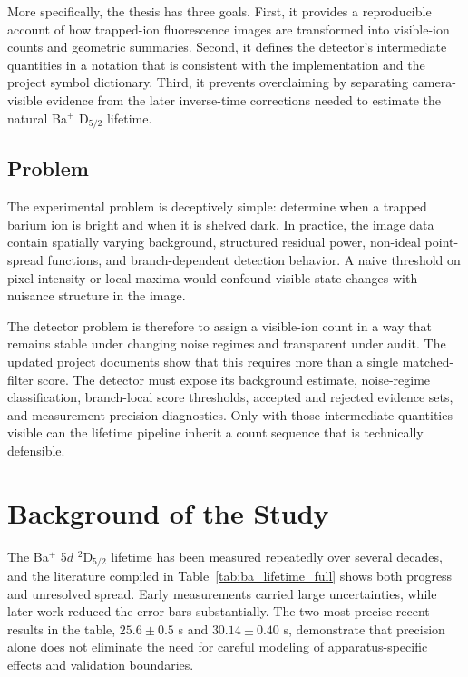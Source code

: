 \documentclass[12pt]{report}
\begin{document}
More specifically, the thesis has three goals. First, it provides a reproducible account of how trapped-ion fluorescence images are transformed into visible-ion counts and geometric summaries. Second, it defines the detector's intermediate quantities in a notation that is consistent with the implementation and the project symbol dictionary. Third, it prevents overclaiming by separating camera-visible evidence from the later inverse-time corrections needed to estimate the natural Ba$^+$ D$_{5/2}$ lifetime.

\section{Problem}

The experimental problem is deceptively simple: determine when a trapped barium ion is bright and when it is shelved dark. In practice, the image data contain spatially varying background, structured residual power, non-ideal point-spread functions, and branch-dependent detection behavior. A naive threshold on pixel intensity or local maxima would confound visible-state changes with nuisance structure in the image.

The detector problem is therefore to assign a visible-ion count in a way that remains stable under changing noise regimes and transparent under audit. The updated project documents show that this requires more than a single matched-filter score. The detector must expose its background estimate, noise-regime classification, branch-local score thresholds, accepted and rejected evidence sets, and measurement-precision diagnostics. Only with those intermediate quantities visible can the lifetime pipeline inherit a count sequence that is technically defensible.

\chapter{Background of the Study}

The Ba$^+$ 5$d$ $^2$D$_{5/2}$ lifetime has been measured repeatedly over several decades, and the literature compiled in Table~\ref{tab:ba_lifetime_full} shows both progress and unresolved spread. Early measurements carried large uncertainties, while later work reduced the error bars substantially. The two most precise recent results in the table, $25.6 \pm 0.5$ s and $30.14 \pm 0.40$ s, demonstrate that precision alone does not eliminate the need for careful modeling of apparatus-specific effects and validation boundaries.
\end{document}
